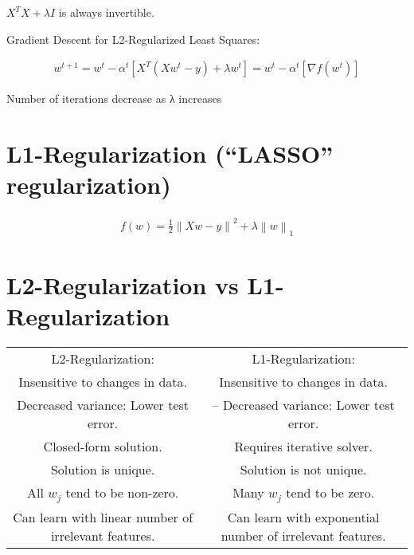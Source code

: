 \begin{remark}
    $X^{T}X + \lambda I$ is always invertible.
\end{remark}

Gradient Descent for L2-Regularized Least Squares:

\begin{align}
    w^{t+1} = w^{t} - \alpha^{t}\left[ X^{T}(Xw^{t} - y) + \lambda w^{t} \right] = w^{t} - \alpha^{t}\left[ \nabla f(w^{t}) \right]
\end{align}

\begin{remark}
    Number of iterations decrease as λ increases
\end{remark}

\section{L1-Regularization (“LASSO” regularization)} \label{sec:}

\begin{align}
    f(w) = \frac{1}{2}\left\| Xw-y \right\|_{}^{2} + \lambda \left\| w \right\|_{1}
\end{align}

\section{L2-Regularization vs L1-Regularization} \label{sec:}
\begin{table}[htbp]
    \centering\begin{tabular}{c|c}
        L2-Regularization: & L1-Regularization:
        \\ Insensitive to changes in data. & Insensitive to changes in data.
        \\ Decreased variance: Lower test error. & – Decreased variance: Lower test error.
        \\ Closed-form solution. & Requires iterative solver.
        \\ Solution is unique. & Solution is not unique.
        \\ All $w_j$ tend to be non-zero. & Many $w_j$ tend to be zero.
        \\ Can learn with linear number of irrelevant features. & Can learn with exponential number 
        of irrelevant features.
    \end{tabular}
\end{table}









